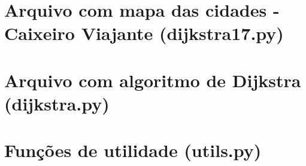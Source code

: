 \documentclass[12pt,plainheader,pnumplain]{abnt}
\newcommand{\src}{src/experiments}
\begin{document}
\newpage
\chapter{Arquivo com mapa das cidades - Caixeiro Viajante (dijkstra17.py)}
\label{appendix:dijks}


\newpage
\chapter{Arquivo com algoritmo de Dijkstra (dijkstra.py)}
\label{appendix:dijks}


\newpage
\chapter{Funções de utilidade (utils.py)}
\label{appendix:fitness}



\end{document}
